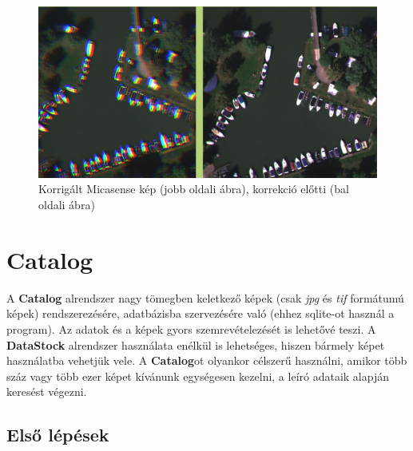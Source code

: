 \documentclass[a4paper,12pt]{article}
\begin{document}
\begin{figure}
	\centering
	\includegraphics[width=14cm]{aligning.png}
	\caption{Korrigált Micasense kép (jobb oldali ábra), korrekció előtti (bal oldali ábra)}
	\label{fig:aligning}
\end{figure}



\section{Catalog}

A \textbf{Catalog} alrendszer nagy tömegben keletkező képek (csak \textit{jpg} és \textit{tif} formátumú képek) rendszerezésére, adatbázisba szervezésére való (ehhez sqlite-ot használ a program). Az adatok és a képek gyors szemrevételezését is lehetővé teszi. A \textbf{DataStock} alrendszer használata enélkül is lehetséges, hiszen bármely képet használatba vehetjük vele. A \textbf{Catalog}ot olyankor célszerű használni, amikor több száz vagy több ezer képet kívánunk egységesen kezelni, a leíró adataik alapján keresést végezni.

\subsection{Első lépések}
\end{document}
